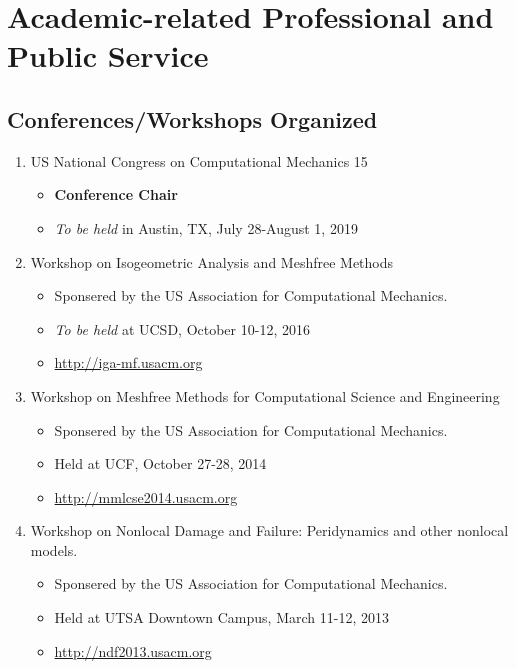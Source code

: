 \section*{Academic-related Professional and Public Service}

\subsection*{Conferences/Workshops Organized}
  \begin{enumerate}
      \item US National Congress on Computational Mechanics 15
          \begin{itemize}
             \item {\bf Conference Chair}
             \item \emph{To be held} in Austin, TX, July 28-August 1, 2019
          \end{itemize}
      \item Workshop on Isogeometric Analysis and Meshfree Methods
          \begin{itemize}
             \item Sponsered by the US Association for Computational Mechanics.
             \item \emph{To be held} at UCSD, October 10-12, 2016
             \item \url{http://iga-mf.usacm.org}
          \end{itemize}
      \item Workshop on Meshfree Methods for Computational Science and Engineering
          \begin{itemize}
             \item Sponsered by the US Association for Computational Mechanics.
             \item Held at UCF, October 27-28, 2014
             \item \url{http://mmlcse2014.usacm.org}
          \end{itemize}
      \item Workshop on Nonlocal Damage and Failure: Peridynamics and other nonlocal models.  
          \begin{itemize}
             \item Sponsered by the US Association for Computational Mechanics.
             \item Held at UTSA Downtown Campus, March 11-12, 2013
             \item \url{http://ndf2013.usacm.org}
          \end{itemize}
  \end{enumerate}


